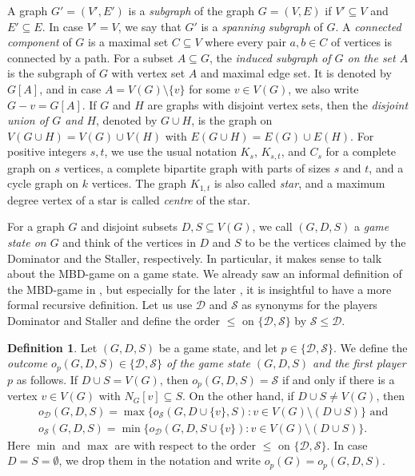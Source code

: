 \documentclass[a4paper,11pt,oneside]{scrartcl}
\theoremstyle{definition}
\newtheorem{definition}{Definition}
\theoremstyle{remark}
\begin{document}
A graph $G' = (V',E')$ is a \emph{subgraph} of the graph $G = (V,E)$ if $V' \subseteq V$ and $E' \subseteq E$. In case $V' = V$, we say that $G'$ is a \emph{spanning subgraph} of $G$. A \emph{connected component} of $G$ is a maximal set $C\subseteq V$ where every pair $a,b \in C$ of vertices is connected by a path. For a subset $A \subseteq G$, the \emph{induced subgraph of $G$ on the set $A$} is the subgraph of $G$ with vertex set $A$ and maximal edge set. It is denoted by $G[A]$, and in case $A = V(G) \setminus \{v\}$ for some $v \in V(G)$, we also write $G-v = G[A]$. If $G$ and $H$ are graphs with disjoint vertex sets, then the \emph{disjoint union of $G$ and $H$}, denoted by $G\cup H$, is the graph on $V(G \cup H) = V(G) \cup V(H)$ with $E(G \cup H) = E(G) \cup E(H)$. For positive integers $s,t$, we use the usual notation $K_s$, $K_{s,t}$, and $C_s$ for a complete graph on $s$ vertices, a complete bipartite graph with parts of sizes $s$ and $t$, and a cycle graph on $k$ vertices. The graph $K_{1,t}$ is also called \emph{star}, and a maximum degree vertex of a star is called \emph{centre} of the star.

For a graph $G$ and disjoint subsets $D, S \subseteq V(G)$, we call $(G,D,S)$ a \emph{game state on $G$} and think of the vertices in $D$ and $S$ to be the vertices claimed by the Dominator and the Staller, respectively. In particular, it makes sense to talk about the MBD-game on a game state. We already saw an informal definition of the MBD-game in , but especially for the later , it is insightful to have a more formal recursive definition. Let us use $\mathcal D$ and $\mathcal S$ as synonyms for the players Dominator and Staller and define the order $\leq$ on $\{\mathcal D, \mathcal S\}$ by $\mathcal S \leq \mathcal D$.

\begin{definition}\label{definition:recursive_outcome}
    Let $(G,D,S)$ be a game state, and let $p \in \{\mathcal D, \mathcal S\}$. We define the \emph{outcome $o_p(G,D,S) \in \{\mathcal D, \mathcal S\}$ of the game state $(G,D,S)$ and the first player $p$} as follows. If $D \cup S = V(G)$, then $o_p(G,D,S) = \mathcal S$ if and only if there is a vertex $v \in V(G)$ with $N_{G}[v] \subseteq S$. On the other hand, if $D \cup S \neq V(G)$, then 
    \begin{align*}
        &o_{\mathcal D}(G,D,S) = \max\{o_{\mathcal S}(G,D\cup \{v\},S) : v \in V(G) \setminus (D \cup S)\} \text{ and}\\
        &o_{\mathcal S}(G,D,S) = \min\{o_{\mathcal D}(G,D,S\cup \{v\}) : v \in V(G) \setminus (D \cup S)\}.
    \end{align*}
    Here $\min$ and $\max$ are with respect to the order $\leq$ on $\{\mathcal D, \mathcal S\}$. 
    In case $D = S = \emptyset$, we drop them in the notation and write $o_p(G) = o_p(G,D,S)$.
\end{definition}
\end{document}
